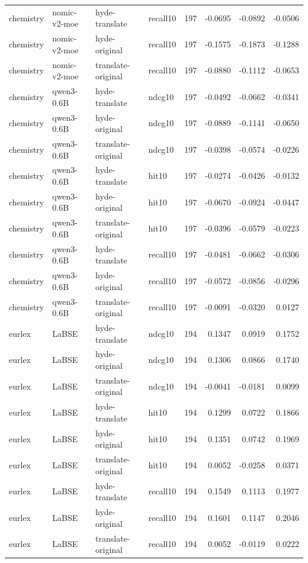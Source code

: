 \begin{tabular}{llllrrrr}
chemistry & nomic-v2-moe & hyde-translate & recall10 & 197 & -0.0695 & -0.0892 & -0.0506 \\
chemistry & nomic-v2-moe & hyde-original & recall10 & 197 & -0.1575 & -0.1873 & -0.1288 \\
chemistry & nomic-v2-moe & translate-original & recall10 & 197 & -0.0880 & -0.1112 & -0.0653 \\
chemistry & qwen3-0.6B & hyde-translate & ndcg10 & 197 & -0.0492 & -0.0662 & -0.0341 \\
chemistry & qwen3-0.6B & hyde-original & ndcg10 & 197 & -0.0889 & -0.1141 & -0.0650 \\
chemistry & qwen3-0.6B & translate-original & ndcg10 & 197 & -0.0398 & -0.0574 & -0.0226 \\
chemistry & qwen3-0.6B & hyde-translate & hit10 & 197 & -0.0274 & -0.0426 & -0.0132 \\
chemistry & qwen3-0.6B & hyde-original & hit10 & 197 & -0.0670 & -0.0924 & -0.0447 \\
chemistry & qwen3-0.6B & translate-original & hit10 & 197 & -0.0396 & -0.0579 & -0.0223 \\
chemistry & qwen3-0.6B & hyde-translate & recall10 & 197 & -0.0481 & -0.0662 & -0.0306 \\
chemistry & qwen3-0.6B & hyde-original & recall10 & 197 & -0.0572 & -0.0856 & -0.0296 \\
chemistry & qwen3-0.6B & translate-original & recall10 & 197 & -0.0091 & -0.0320 & 0.0127 \\
eurlex & LaBSE & hyde-translate & ndcg10 & 194 & 0.1347 & 0.0919 & 0.1752 \\
eurlex & LaBSE & hyde-original & ndcg10 & 194 & 0.1306 & 0.0866 & 0.1740 \\
eurlex & LaBSE & translate-original & ndcg10 & 194 & -0.0041 & -0.0181 & 0.0099 \\
eurlex & LaBSE & hyde-translate & hit10 & 194 & 0.1299 & 0.0722 & 0.1866 \\
eurlex & LaBSE & hyde-original & hit10 & 194 & 0.1351 & 0.0742 & 0.1969 \\
eurlex & LaBSE & translate-original & hit10 & 194 & 0.0052 & -0.0258 & 0.0371 \\
eurlex & LaBSE & hyde-translate & recall10 & 194 & 0.1549 & 0.1113 & 0.1977 \\
eurlex & LaBSE & hyde-original & recall10 & 194 & 0.1601 & 0.1147 & 0.2046 \\
eurlex & LaBSE & translate-original & recall10 & 194 & 0.0052 & -0.0119 & 0.0222 \\

\end{tabular}
